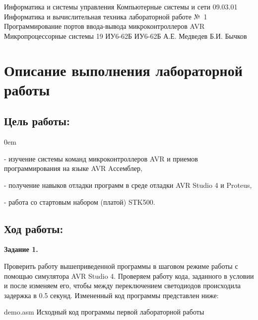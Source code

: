 \documentclass{bmstu}
\begin{document}
\renewcommand\thefigure{\arabic{figure}} 

\def\numberWork{1}

\makereporttitle
    {Информатика и системы управления} %
    {Компьютерные системы и сети} %
    {09.03.01 Информатика и вычислительная техника} %
    {лабораторной работе №~1 } %
    { Программирование портов ввода-вывода
микроконтроллеров AVR} %
    { Микропроцессорные системы} %
    { 19 } %
    {ИУ6-62Б} %
    {
    	{ИУ6-62Б}
    	{А.Е. Медведев} %
    	{Б.И. Бычков} %
    } 


\chapter{Описание выполнения лабораторной работы}

\section{Цель работы:}
\begin{description}
\addtolength{\itemindent}{0.80cm}

\itemsep0em 
\item - изучение системы команд микроконтроллеров AVR и приемов программирования на языке AVR Aссемблер,
\item - получение навыков отладки программ в среде отладки AVR Studio 4 и Proteus,
\item - работа со стартовым набором (платой) STK500.
\end{description} 


\section{Ход работы:}
\textbf{Задание 1.}

	Проверить работу вышеприведенной программы в шаговом режиме
работы с помощью симулятора AVR Studio 4.
Проверяем работу кода, заданного в условии и после изменяем его,
чтобы между переключением светодиодов происходила задержка в 0.5 секунд.
Измененный код программы представлен ниже:

    {demo.asm} %
    {Исходный код программы первой лабораторной работы} %
\end{document}

